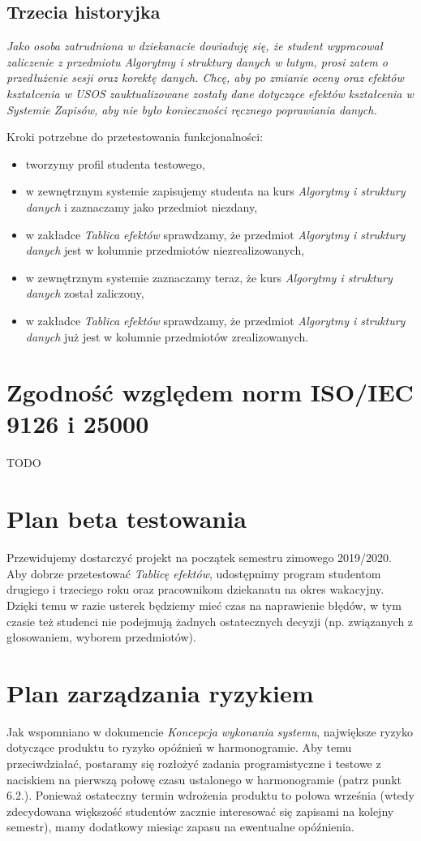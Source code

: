 \documentclass{article}
\begin{document}
\subsection{Trzecia historyjka}
\textit{Jako osoba zatrudniona w dziekanacie dowiaduję się, że student wypracował zaliczenie z przedmiotu \textit{Algorytmy i struktury danych} w lutym, prosi zatem o przedłużenie sesji oraz korektę danych. 
Chcę, aby po zmianie oceny oraz efektów kształcenia w USOS zauktualizowane zostały dane dotyczące efektów kształcenia w Systemie Zapisów, aby nie było konieczności ręcznego poprawiania danych.}

\medskip
\noindent Kroki potrzebne do przetestowania funkcjonalności:
\begin{itemize}
 \item tworzymy profil studenta testowego,
 \item w zewnętrznym systemie zapisujemy studenta na kurs \textit{Algorytmy i struktury danych} i zaznaczamy jako przedmiot niezdany,
 \item w zakładce \textit{Tablica efektów} sprawdzamy, że przedmiot \textit{Algorytmy i struktury danych} jest w kolumnie przedmiotów niezrealizowanych,
 \item w zewnętrznym systemie zaznaczamy teraz, że kurs \textit{Algorytmy i struktury danych} został zaliczony,
 \item w zakładce \textit{Tablica efektów} sprawdzamy, że przedmiot \textit{Algorytmy i struktury danych} już jest w kolumnie przedmiotów zrealizowanych.
\end{itemize}

\section{Zgodność względem norm ISO/IEC 9126 i 25000}
TODO

\section{Plan beta testowania}
Przewidujemy dostarczyć projekt na początek semestru zimowego 2019/2020.
Aby dobrze przetestować \textit{Tablicę efektów}, udostępnimy program studentom drugiego i trzeciego roku oraz pracownikom dziekanatu na okres wakacyjny.
Dzięki temu w razie usterek będziemy mieć czas na naprawienie błędów, w tym czasie też studenci nie podejmują żadnych ostatecznych decyzji (np. związanych z głosowaniem, wyborem przedmiotów).

\section{Plan zarządzania ryzykiem}
Jak wspomniano w dokumencie \textit{Koncepcja wykonania systemu}, największe ryzyko dotyczące produktu to ryzyko opóźnień w harmonogramie.
Aby temu przeciwdziałać, postaramy się rozłożyć zadania programistyczne i testowe z naciskiem na pierwszą połowę czasu ustalonego w harmonogramie (patrz punkt 6.2.).
Ponieważ ostateczny termin wdrożenia produktu to połowa września (wtedy zdecydowana większość studentów zacznie interesować się zapisami na kolejny semestr), mamy dodatkowy miesiąc zapasu na ewentualne opóźnienia.
\end{document}
